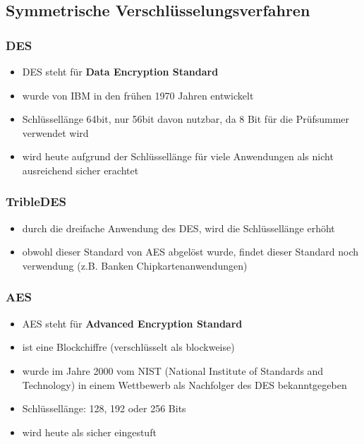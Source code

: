 \subsection{Symmetrische Verschlüsselungsverfahren}

\subsubsection{DES}

\begin{itemize}
\item DES steht für \textbf{Data Encryption Standard}
\item wurde von IBM in den frühen 1970 Jahren entwickelt
\item Schlüssellänge 64bit, nur 56bit davon nutzbar, da 8 Bit für die Prüfsummer verwendet wird
\item wird heute aufgrund der Schlüssellänge für viele Anwendungen als nicht ausreichend sicher erachtet
\end{itemize}

\subsubsection{TribleDES}

\begin{itemize}
\item durch die dreifache Anwendung des DES, wird die Schlüssellänge erhöht
\item obwohl dieser Standard von AES abgelöst wurde, findet dieser Standard noch verwendung (z.B. Banken Chipkartenanwendungen)
\end{itemize}

\subsubsection{AES}

\begin{itemize}
\item AES steht für \textbf{Advanced Encryption Standard}
\item ist eine Blockchiffre (verschlüsselt als blockweise)
\item wurde im Jahre 2000 vom NIST (National Institute of Standards and Technology) in einem Wettbewerb als Nachfolger des DES bekanntgegeben
\item Schlüssellänge: 128, 192 oder 256 Bits
\item wird heute als sicher eingestuft
\end{itemize}

